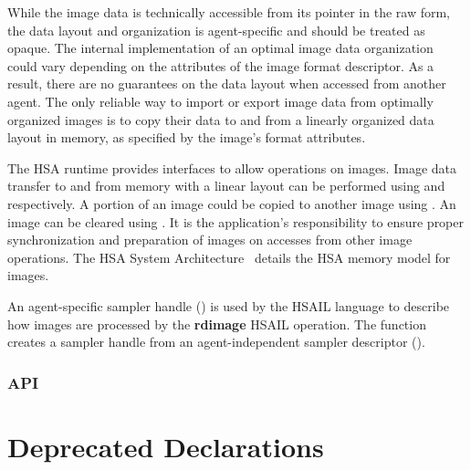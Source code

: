 \documentclass[final,oneside]{book}
\newcommand{\reffun}[1]{\textbf{#1}}
\newcommand{\refhsl}[1]{\reffun{#1}}
\begin{document}
While the image data is technically accessible from its pointer in the raw form,
the data layout and organization is agent-specific and should be treated as
opaque. The internal implementation of an optimal image data organization could
vary depending on the attributes of the image format descriptor. As a result,
there are no guarantees on the data layout when accessed from another agent. The
only reliable way to import or export image data from optimally organized images
is to copy their data to and from a linearly organized data layout in memory, as
specified by the image's format attributes.

The HSA runtime provides interfaces to allow operations on images. Image data
transfer to and from memory with a linear layout can be performed using
 and  respectively. A
portion of an image could be copied to another image using
. An image can be cleared using
. It is the application's responsibility to ensure
proper synchronization and preparation of images on accesses from other image
operations. The HSA System Architecture~\cite{sar} details the HSA memory
model for images.

An agent-specific sampler handle () is used by the
HSAIL language to describe how images are processed by the \refhsl{rdimage}
HSAIL operation. The function  creates a sampler
handle from an agent-independent sampler descriptor
().

\subsection{API}



\chapter{Deprecated Declarations}




\appendix
\end{document}
